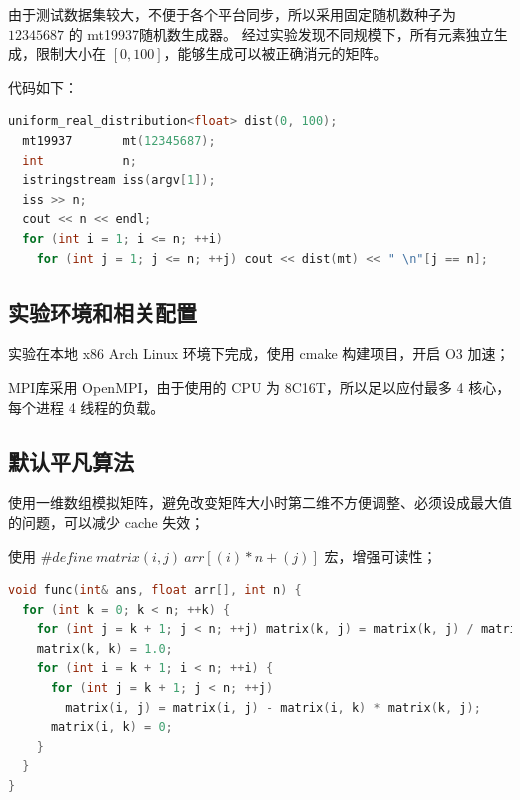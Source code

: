 \documentclass[a4paper]{article}
\begin{document}
由于测试数据集较大，不便于各个平台同步，所以采用固定随机数种子为 $12345687$ 的 mt19937随机数生成器。
经过实验发现不同规模下，所有元素独立生成，限制大小在 $[0, 100]$，能够生成可以被正确消元的矩阵。

代码如下：

\begin{lstlisting}[frame=trbl,language={C++}]
  uniform_real_distribution<float> dist(0, 100);
  mt19937       mt(12345687);
  int           n;
  istringstream iss(argv[1]);
  iss >> n;
  cout << n << endl;
  for (int i = 1; i <= n; ++i)
    for (int j = 1; j <= n; ++j) cout << dist(mt) << " \n"[j == n];
\end{lstlisting}

\subsection{实验环境和相关配置}

实验在本地 x86 Arch Linux 环境下完成，使用 cmake 构建项目，开启 O3 加速；

MPI库采用 OpenMPI，由于使用的 CPU 为 8C16T，所以足以应付最多 4 核心，每个进程 4 线程的负载。

\subsection{默认平凡算法}

使用一维数组模拟矩阵，避免改变矩阵大小时第二维不方便调整、必须设成最大值的问题，可以减少 cache 失效；

使用 $\#define\ matrix(i, j)\ arr[(i) * n + (j)]$ 宏，增强可读性；

\begin{lstlisting}[frame=trbl,language={C++}]
void func(int& ans, float arr[], int n) {
  for (int k = 0; k < n; ++k) {
    for (int j = k + 1; j < n; ++j) matrix(k, j) = matrix(k, j) / matrix(k, k);
    matrix(k, k) = 1.0;
    for (int i = k + 1; i < n; ++i) {
      for (int j = k + 1; j < n; ++j)
        matrix(i, j) = matrix(i, j) - matrix(i, k) * matrix(k, j);
      matrix(i, k) = 0;
    }
  }
}
\end{lstlisting}
\end{document}
